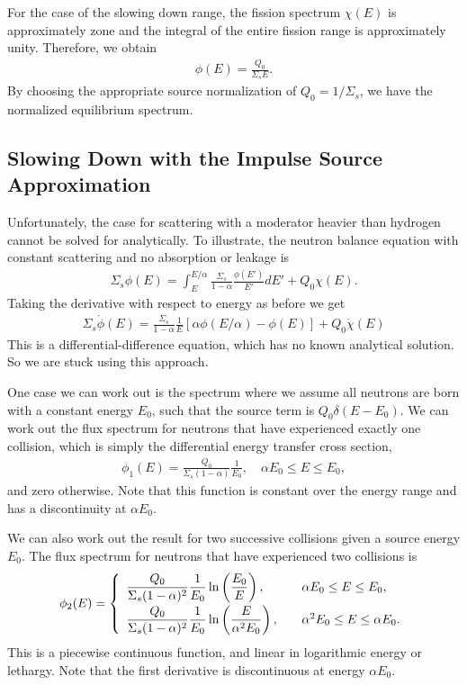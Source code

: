 For the case of the slowing down range, the fission spectrum $\chi(E)$ is approximately zone and the integral of the entire fission range is approximately unity. Therefore, we obtain
\begin{align}
  \phi(E) = \frac{ Q_0 }{ \Sigma_s E } .
\end{align}
By choosing the appropriate source normalization of $Q_0 = 1/\Sigma_s$, we have the normalized equilibrium spectrum.

\subsection{Slowing Down with the Impulse Source Approximation}

Unfortunately, the case for scattering with a moderator heavier than hydrogen cannot be solved for analytically. To illustrate, the neutron balance equation with constant scattering and no absorption or leakage is
\begin{align}
  \Sigma_s \phi(E) = \int_E^{E/\alpha} \frac{\Sigma_s}{1-\alpha} \frac{\phi(E')}{E'} dE' + Q_0 \chi(E) .
\end{align}
Taking the derivative with respect to energy as before we get
\begin{align}
  \Sigma_s \dot{\phi}(E) = \frac{\Sigma_s }{1-\alpha} \frac{1}{E} \left[ \alpha \phi(E/\alpha) - \phi(E) \right] + Q_0 \dot{\chi}(E)
\end{align}
This is a differential-difference equation, which has no known analytical solution. So we are stuck using this approach.

One case we can work out is the spectrum where we assume all neutrons are born with a constant energy $E_0$, such that the source term is $Q_0 \delta( E - E_0 )$. We can work out the flux spectrum for neutrons that have experienced exactly one collision, which is simply the differential energy transfer cross section,
\begin{align}
  \phi_1(E) = \frac{Q_0}{\Sigma_s ( 1 - \alpha ) } \frac{1}{E_0} , \quad \alpha E_0 \le E \le E_0,
\end{align}
and zero otherwise. Note that this function is constant over the energy range and has a discontinuity at $\alpha E_0$.

We can also work out the result for two successive collisions given a source energy $E_0$. The flux spectrum for neutrons that have experienced two collisions is
\begin{align}
   \phi_2(E) = \left\{ \begin{array}{l l}
   \dfrac{Q_0}{\Sigma_s ( 1 - \alpha )^2 } \dfrac{1}{E_0} \ln\left( \dfrac{E_0}{E} \right), & \quad \alpha E_0 \le E \le E_0,  \vspace{0.2em} \\
   \dfrac{Q_0}{\Sigma_s ( 1 - \alpha )^2 } \dfrac{1}{E_0} \ln\left( \dfrac{E}{\alpha^2 E_0} \right), & \quad \alpha^2 E_0 \le E \le \alpha E_0. \\ \end{array} \right.
\end{align}
This is a piecewise continuous function, and linear in logarithmic energy or lethargy. Note that the first derivative is discontinuous at energy $\alpha E_0$.

